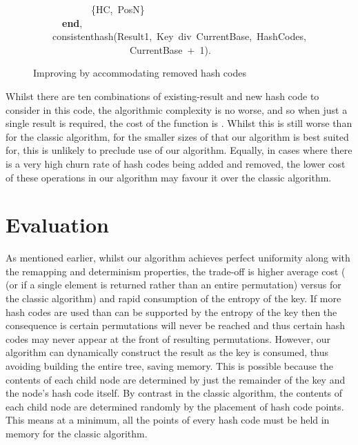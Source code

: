 \documentclass[runningheads,a4paper]{llncs}
\newcommand{\hlstd}[1]{\textcolor[rgb]{0,0,0}{#1}}
\newcommand{\hlnum}[1]{\textcolor[rgb]{0.69,0.49,0}{#1}}
\newcommand{\hlopt}[1]{\textcolor[rgb]{0,0,0}{#1}}
\newcommand{\hlkwa}[1]{\textcolor[rgb]{0,0,0}{\bf{#1}}}
\newcommand{\hlkwd}[1]{\textcolor[rgb]{0,0,0.51}{#1}}
\begin{document}
\begin{figure}
\hlstd{}\hlstd{\ \ \ \ \ \ \ \ \ \ \ \ }\hlstd{}\hlopt{\{}\hlstd{HC}\hlopt{,\ }\hlstd{PosN}\hlopt{\}}\hspace*{\fill}\\
\hlstd{}\hlstd{\ \ \ \ \ \ }\hlstd{}\hlkwa{end}\hlstd{}\hlopt{,}\hspace*{\fill}\\
\hlstd{}\hlstd{\ \ \ \ }\hlstd{}\hlkwd{consistent\textunderscore hash}\hlstd{}\hlopt{(}\hlstd{Result1}\hlopt{,\ }\hlstd{Key\ div\ CurrentBase}\hlopt{,\ }\hlstd{HashCodes}\hlopt{,}\hspace*{\fill}\\
\hlstd{}\hlstd{\ \ \ \ \ \ \ \ \ \ \ \ \ \ \ \ \ \ \ \ }\hlstd{CurrentBase\ }\hlopt{+\ }\hlstd{}\hlnum{1}\hlstd{}\hlopt{).}\hspace*{\fill}\\
\mbox{}
\normalfont
\normalsize
\caption{Improving  by accommodating removed hash codes}
\label{fig:code:new-one-result-marker}
\end{figure}

Whilst there are ten combinations of existing-result and new hash code
to consider in this code, the algorithmic complexity is no worse, and
so when just a single result is required, the cost of the function is
. Whilst this is still worse than for the classic
algorithm, for the smaller sizes of  that our algorithm is best
suited for, this is unlikely to preclude use of our
algorithm. Equally, in cases where there is a very high churn rate of
hash codes being added and removed, the lower cost of these operations
in our algorithm may favour it over the classic algorithm.

\section{Evaluation}

As mentioned earlier, whilst our algorithm achieves perfect uniformity
along with the remapping and determinism properties, the trade-off is
higher average cost ( (or 
if a single element is returned rather than an entire permutation)
versus  for the classic algorithm) and rapid
consumption of the entropy of the key. If more hash codes are used
than can be supported by the entropy of the key then the consequence
is certain permutations will never be reached and thus certain hash
codes may never appear at the front of resulting
permutations. However, our algorithm can dynamically construct the
result as the key is consumed, thus avoiding building the entire tree,
saving memory. This is possible because the contents of each child
node are determined by just the remainder of the key and the node's
hash code itself. By contrast in the classic algorithm, the contents
of each child node are determined randomly by the placement of hash
code points. This means at a minimum, all the points of every hash
code must be held in memory for the classic algorithm.
\end{document}
